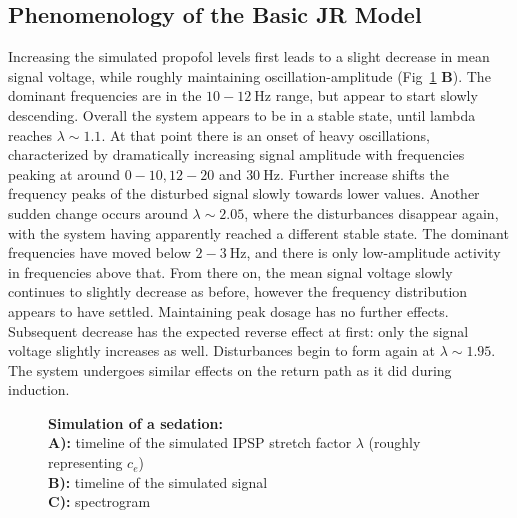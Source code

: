 \newtoggle{drawLocRoc}

\subsection{Phenomenology of the Basic JR Model}
    Increasing the simulated propofol levels first leads to a slight decrease in mean signal voltage, while roughly
    maintaining oscillation-amplitude (Fig~\ref{fig:sedation_sim_jr} \textbf{B}).
    The dominant frequencies are in the $ 10-12 \SI{}{\hertz} $ range, but appear to start slowly descending.
    Overall the system appears to be in a stable state,
    until lambda reaches $ \lambda \sim 1.1 $.
    At that point there is an onset of heavy oscillations, characterized by dramatically increasing signal amplitude
    with frequencies peaking at around $0-10, 12-20$ and $ \SI{30}{\hertz} $.
    Further increase shifts the frequency peaks of the disturbed signal slowly towards lower values.
    Another sudden change occurs around $\lambda \sim 2.05 $,
    where the disturbances disappear again,
    with the system having apparently reached a different stable state.
    The dominant frequencies have moved below $2- \SI{3}{\hertz}$,
    and there is only low-amplitude activity in frequencies above that.
    From there on, the mean signal voltage slowly continues to slightly decrease as before,
    however the frequency distribution appears to have settled.
    Maintaining peak dosage has no further effects.
    Subsequent decrease has the expected reverse effect at first: only the signal voltage slightly increases
    as well.
    Disturbances begin to form again at $\lambda \sim 1.95$.
    The system undergoes similar effects on the return path as it did during induction.



\begin{figure}[H]
\togglefalse{drawLocRoc}
\def\simRunName{jr_simple}

\caption{\textbf{Simulation of a sedation:} \\
        \textbf{A):} timeline of the simulated IPSP stretch factor $\lambda$ (roughly representing $c_e$) \\
        \textbf{B):} timeline of the simulated signal \\
        \textbf{C):} spectrogram
}\label{fig:sedation_sim_jr}
\end{figure}
